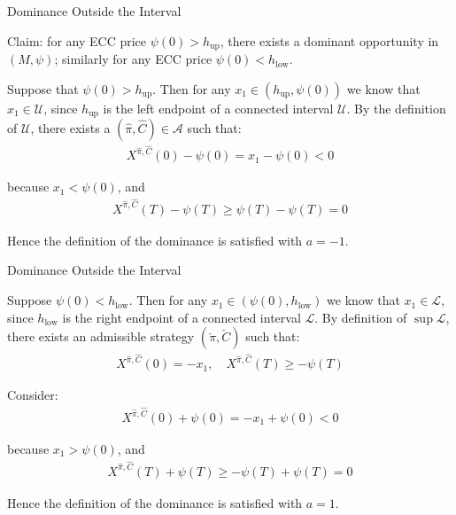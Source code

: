 \documentclass{beamer}
\begin{document}
\begin{frame}{Dominance Outside the Interval}

    {\footnotesize \footnotesize
    \par  Claim: for any ECC price $\psi(0) > h_{\text{up}}$, 
    there exists a dominant opportunity in $(M, \psi)$; similarly for any ECC price $\psi(0) < h_{\text{low}}$.
    \vspace{1em}
    \par Suppose that $\psi(0) > h_{\text{up}}$. Then for any $x_1 \in (h_{\text{up}}, \psi(0))$ we know that $x_1 \in \mathcal{U}$, since $h_{\text{up}}$ is 
    the left endpoint of a connected interval $\mathcal{U}$. By the definition of $\mathcal{U}$, there exists 
    a $(\hat{\pi}, \hat{C}) \in \mathcal{A}$ such that:
    \begin{align*}
        X^{\hat{\pi}, \hat{C}}(0) - \psi(0) = x_1 - \psi(0) < 0
    \end{align*}
    \par because $x_1 < \psi(0)$, and
    \begin{align*}
        X^{\hat{\pi}, \hat{C}}(T) - \psi(T) \geq \psi(T) - \psi(T) = 0
    \end{align*}
    \par Hence the definition of the dominance is satisfied with $a = -1$. 
    }
\end{frame} 

\begin{frame}{Dominance Outside the Interval}

    {\footnotesize \footnotesize
    \par  Suppose $\psi(0) < h_{\text{low}}$. Then for any $x_1 \in (\psi(0),h_{\text{low}})$ we 
    know that $x_1 \in \mathcal{L}$, since $h_{\text{low}}$ is 
    the right endpoint of a connected interval $\mathcal{L}$. By definition of $\sup \mathcal{L}$, 
     there exists an admissible strategy $(\check{\pi}, \check{C})$ such that: 
     \begin{align*}
         X^{\hat{\pi}, \hat{C}}(0) = -x_1, \quad X^{\hat{\pi}, \hat{C}}(T) \geq -\psi(T)
     \end{align*}
     \par Consider: 
     \begin{align*}
         X^{\hat{\pi}, \hat{C}}(0) + \psi(0) = -x_1 + \psi(0) < 0
     \end{align*}
     \par because $x_1 > \psi(0)$, and
     \begin{align*}
        X^{\hat{\pi}, \hat{C}}(T) + \psi(T) \geq -\psi(T) + \psi(T) = 0
    \end{align*}
    \par Hence the definition of the dominance is satisfied with $a = 1$. 
    }
\end{frame} 
\end{document}
